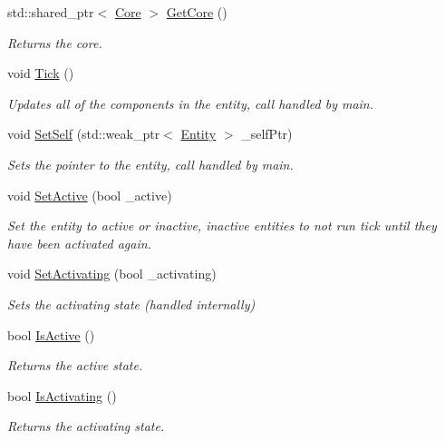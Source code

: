 \begin{DoxyCompactItemize}
std\+::shared\+\_\+ptr$<$ \hyperlink{classfrontier_1_1_core}{Core} $>$ \hyperlink{classfrontier_1_1_entity_af1c56e995259d4cef5221dbc3304b819}{Get\+Core} ()
\begin{DoxyCompactList}\small\item\em Returns the core. \end{DoxyCompactList}\item 
void \hyperlink{classfrontier_1_1_entity_a9f8063271fecd3ff15cfb2f3d6afa2e4}{Tick} ()
\begin{DoxyCompactList}\small\item\em Updates all of the components in the entity, call handled by main. \end{DoxyCompactList}\item 
void \hyperlink{classfrontier_1_1_entity_a431409dd431097a4c523cb6cc83edb0c}{Set\+Self} (std\+::weak\+\_\+ptr$<$ \hyperlink{classfrontier_1_1_entity}{Entity} $>$ \+\_\+self\+Ptr)
\begin{DoxyCompactList}\small\item\em Sets the pointer to the entity, call handled by main. \end{DoxyCompactList}\item 
void \hyperlink{classfrontier_1_1_entity_ae5fd143b1a7bd1955717c850382a0794}{Set\+Active} (bool \+\_\+active)
\begin{DoxyCompactList}\small\item\em Set the entity to active or inactive, inactive entities to not run tick until they have been activated again. \end{DoxyCompactList}\item 
void \hyperlink{classfrontier_1_1_entity_aaa990e97d41e4c2c48d4e91247def935}{Set\+Activating} (bool \+\_\+activating)
\begin{DoxyCompactList}\small\item\em Sets the activating state (handled internally) \end{DoxyCompactList}\item 
bool \hyperlink{classfrontier_1_1_entity_a18ff08281282ad84e50678009ba7d5f8}{Is\+Active} ()
\begin{DoxyCompactList}\small\item\em Returns the active state. \end{DoxyCompactList}\item 
bool \hyperlink{classfrontier_1_1_entity_ae7fad9388c0d91307c7103871e10aeeb}{Is\+Activating} ()
\begin{DoxyCompactList}\small\item\em Returns the activating state. \end{DoxyCompactList}\item 

\end{DoxyCompactItemize}
